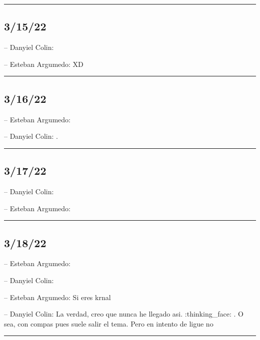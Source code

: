 \begin{center}\rule{0.5\linewidth}{0.5pt}\end{center}

\hypertarget{section-33}{%
\subsection{3/15/22}\label{section-33}}

-- Danyiel Colin:

-- Esteban Argumedo: XD

\begin{center}\rule{0.5\linewidth}{0.5pt}\end{center}

\hypertarget{section-34}{%
\subsection{3/16/22}\label{section-34}}

-- Esteban Argumedo:

-- Danyiel Colin: .

\begin{center}\rule{0.5\linewidth}{0.5pt}\end{center}

\hypertarget{section-35}{%
\subsection{3/17/22}\label{section-35}}

-- Danyiel Colin:

-- Esteban Argumedo:

\begin{center}\rule{0.5\linewidth}{0.5pt}\end{center}

\hypertarget{section-36}{%
\subsection{3/18/22}\label{section-36}}

-- Esteban Argumedo:

-- Danyiel Colin:

-- Esteban Argumedo: Si eres krnal

-- Danyiel Colin: La verdad, creo que nunca he llegado asi.
:thinking\_face: . O sea, con compas pues suele salir el tema. Pero en
intento de ligue no

\begin{center}\rule{0.5\linewidth}{0.5pt}\end{center}


